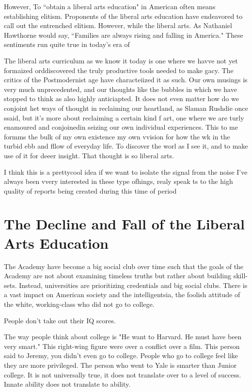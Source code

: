 \documentclass[12pt,letterpaper]{article}
\begin{document}
However, To ``obtain a liberal arts education" in American often means establishing elitism.  Proponents of the liberal arts education have endeavored to call out the entrenched elitism.  However, while the liberal arts.  As Nathaniel Hawthorne would say, ``Families are always rising and falling in America."  These sentiments run quite true in today's era of 

The liberal arts curriculum as we know it today is one where we havve not yet formaized orddiscovered the truly productive tools needed to make gacy.  The critics of the Postmodernist age have characteiized it as such.  Our own musings is very much unprecedented, and our thoughts like the bubbles in which we have stopped to think as also highly anticiapted.  It does not even matter how do we conjoint het ways of thought in reclaiming our heartland, as Slaman Rushdie once ssaid, but it's more about reclaiming a certain kind f art, one where we are turly enamoured and conjoinedin seizing our own individual experiences.  This to me formms the bulk of my own existence my own vvision for how the wk in the turbid ebb and fllow of everyday life.  To discover the worl as I see it, and to make use of it for deeer insight.  That thought is so liberal arts.

I think this is a prettycool idea if we want to isolate the signal from the noise  I've always been vvery interested in these type ofhings, realy speak ts to the high quality  of reports being created during this time of period



\section{The Decline and Fall of the Liberal Arts Education} 

The Academy have become a big social club over time such that the goals of the Academy are not about examining timeless truths but rather about building skill-sets.  Instead, universities are prioritizing credentials and big social clubs.  There is a vast impact on American society and the intelligentsia, the foolish attitude of the white, working-class who did not go to college.  

People don't take out their IQ scores.

The way people think about college is "He want to Harvard.  He must have been very smart."  This right-wing figure were over a conflict over a film.  This person said to Jeremy, you didn't even go to college.  People who go to college feel like they are more privileged.  The person who went to Yale is smarter than Junior college.  It is not universally true, it does not translate over to a level of success.  Innate ability does not translate to ability.
\end{document}
